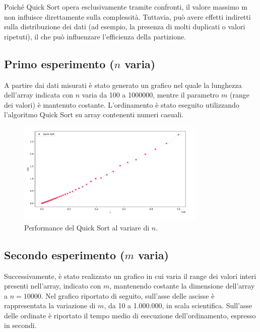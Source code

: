 \documentclass[a4paper, 12pt, oneside]{book}
\begin{document}
\noindent
Poiché Quick Sort opera esclusivamente tramite confronti, il valore massimo m non influisce direttamente sulla complessità. Tuttavia, può avere effetti indiretti sulla distribuzione dei dati (ad esempio, la presenza di molti duplicati o valori ripetuti), il che può influenzare l'efficienza della partizione. \\

\subsection{Primo esperimento ($n$ varia)}

A partire dai dati misurati è stato generato un grafico nel quale la lunghezza dell'array indicata con \(n\) varia da 100 a 1000000, mentre il parametro \(m\) (range dei valori) è mantenuto costante. L'ordinamento è stato eseguito utilizzando l'algoritmo Quick Sort su array contenenti numeri casuali.

\begin{figure}[H]
    \centering
    \includegraphics[width=0.8\textwidth]{images/grafico_quick_sort_n.png}
    \caption{Performance del Quick Sort al variare di \(n\).}
    \label{fig:quick_sort_n}
\end{figure}

\subsection{Secondo esperimento ($m$ varia)}

\noindent Successivamente, è stato realizzato un grafico in cui varia il range dei valori interi presenti nell'array, indicato con \(m\), mantenendo costante la dimensione dell'array a \(n=10000\). Nel grafico riportato di seguito, sull'asse delle ascisse è rappresentata la variazione di \(m\), da 10 a 1.000.000, in scala scientifica. Sull'asse delle ordinate è riportato il tempo medio di esecuzione dell'ordinamento, espresso in secondi.
\end{document}
